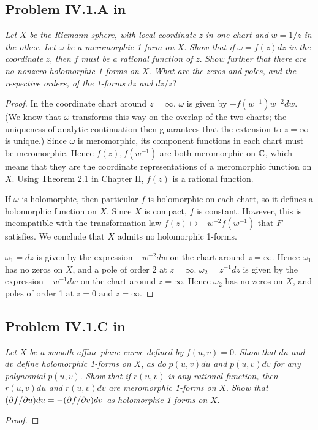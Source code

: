 \documentclass{article}
\begin{document}
\subsection*{Problem IV.1.A in \cite{Mir}}
\textit{Let} $X$ \textit{be the Riemann sphere, with local coordinate} $z$ \textit{in one chart
and} $w=1/z$ \textit{in the other. Let} $\omega$ \textit{be a meromorphic 1-form on} $X$. \textit{Show
that if} $\omega = f(z) dz$ \textit{in the coordinate} $z$, \textit{then} $f$ \textit{must be a rational
function of} $z$. \textit{Show further that there are no nonzero holomorphic 1-forms on} $X$. \textit{What
are the zeros and poles, and the respective orders, of the 1-forms} $dz$ \textit{and} $dz/z$?
\begin{proof}
In the coordinate chart around $z=\infty$, $\omega$ is given by $-f(w^{-1})w^{-2} dw$. (We know that
$\omega$ transforms this way on the overlap of the two charts; the uniqueness of analytic continuation
then guarantees that the extension to $z = \infty$ is unique.) Since $\omega$
is meromorphic, its component functions in each chart must be meromorphic. Hence $f(z), f(w^{-1})$ are
both meromorphic on $\mathbb{C}$, which means that they are the coordinate representations of a meromorphic
function on $X$. Using Theorem 2.1 in Chapter II, $f(z)$ is a rational function.

If $\omega$ is holomorphic, then particular $f$ is holomorphic on each chart, so it defines a holomorphic
function on $X$. Since $X$ is compact, $f$ is constant. However, this is incompatible with the transformation
law $f(z) \mapsto -w^{-2}f(w^{-1})$ that $F$ satisfies. We conclude that $X$ admits no holomorphic 1-forms.

$\omega_1 = dz$ is given by the expression $-w^{-2} dw$ on the chart around $z=\infty$. Hence $\omega_1$
has no zeros on $X$, and a pole of order 2 at $z=\infty$. $\omega_2 = z^{-1}dz$ is given by the expression
$-w^{-1}dw$ on the chart around $z=\infty$. Hence $\omega_2$ has no zeros on $X$, and poles of order 1
at $z = 0$ and $z=\infty$.
\end{proof}

\subsection*{Problem IV.1.C in \cite{Mir}}
\textit{Let} $X$ \textit{be a smooth affine plane curve defined by} $f(u,v) = 0$. \textit{Show that}
$du$ \textit{and} $dv$ \textit{define holomorphic 1-forms on} $X$, \textit{as do} $p(u,v) du$ \textit{and}
$p(u,v)dv$ \textit{for any polynomial} $p(u,v)$. \textit{Show that if} $r(u,v)$ \textit{is any rational
function, then} $r(u,v) du$ \textit{and} $r(u,v)dv$ \textit{are meromorphic 1-forms on} $X$. \textit{Show 
that} $(\partial f/\partial u) du= - (\partial f/\partial v) dv$ \textit{as holomorphic 1-forms on} $X$.
\begin{proof}

\end{proof}
\end{document}
